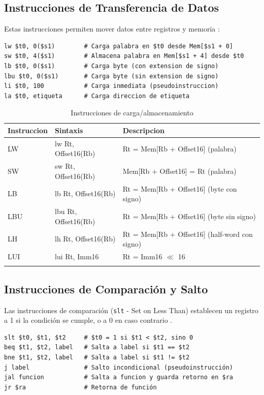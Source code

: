 \documentclass[12pt]{article}
\begin{document}
\subsection{Instrucciones de Transferencia de Datos}

Estas instrucciones permiten mover datos entre registros y memoria \cite{mipsguide}:

\begin{lstlisting}[caption=Ejemplos de carga y almacenamiento, label=lst:memoria]
lw $t0, 0($s1)        # Carga palabra en $t0 desde Mem[$s1 + 0]
sw $t0, 4($s1)        # Almacena palabra en Mem[$s1 + 4] desde $t0
lb $t0, 0($s1)        # Carga byte (con extension de signo)
lbu $t0, 0($s1)       # Carga byte (sin extension de signo)
li $t0, 100           # Carga inmediata (pseudoinstruccion)
la $t0, etiqueta      # Carga direccion de etiqueta
\end{lstlisting}

\begin{longtable}{|l|l|l|}
    \hline
    \textbf{Instruccion} & \textbf{Sintaxis} & \textbf{Descripcion} \\
    \hline
    LW & lw Rt, Offset16(Rb) & Rt = Mem[Rb + Offset16] (palabra) \\
    \hline
    SW & sw Rt, Offset16(Rb) & Mem[Rb + Offset16] = Rt (palabra) \\
    \hline
    LB & lb Rt, Offset16(Rb) & Rt = Mem[Rb + Offset16] (byte con signo) \\
    \hline
    LBU & lbu Rt, Offset16(Rb) & Rt = Mem[Rb + Offset16] (byte sin signo) \\
    \hline
    LH & lh Rt, Offset16(Rb) & Rt = Mem[Rb + Offset16] (half-word con signo) \\
    \hline
    LUI & lui Rt, Imm16 & Rt = Imm16 $\ll$ 16 \\
    \hline
    \caption{Instrucciones de carga/almacenamiento}
\end{longtable}

\subsection{Instrucciones de Comparación y Salto}

Las instrucciones de comparación (\texttt{slt} - Set on Less Than) establecen un registro a 1 si la condición se cumple, o a 0 en caso contrario \cite{mipsguide}.

\begin{lstlisting}[caption=Ejemplos de comparación y saltos, label=lst:branch]
slt $t0, $t1, $t2     # $t0 = 1 si $t1 < $t2, sino 0
beq $t1, $t2, label   # Salta a label si $t1 == $t2
bne $t1, $t2, label   # Salta a label si $t1 != $t2
j label               # Salto incondicional (pseudoinstrucción)
jal funcion           # Salta a funcion y guarda retorno en $ra
jr $ra                # Retorna de función
\end{lstlisting}
\end{document}
